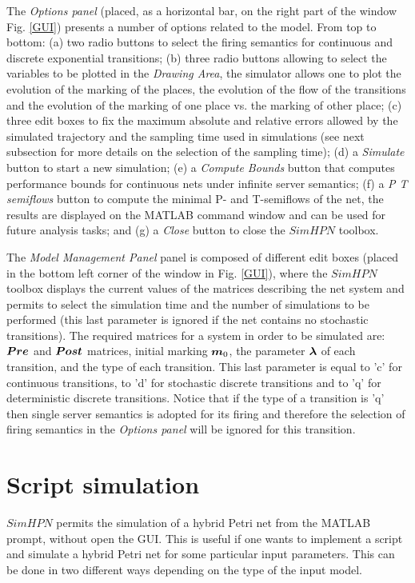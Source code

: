 The \emph{Options panel} (placed, as a horizontal bar, on the right part of the window Fig. \ref{GUI}) presents a number of options related to the model. From top to bottom: (a) two radio buttons to select the firing semantics for continuous and discrete exponential  transitions; (b) three radio buttons allowing to select the variables to be plotted in the \emph{Drawing Area}, the simulator allows one to plot the evolution of the marking
of the places, the evolution of the flow of the transitions and
the evolution of the marking of one place vs. the marking of other
place; (c) three edit boxes to fix the maximum absolute and relative errors allowed by the simulated trajectory and the sampling time used in simulations (see next subsection for more details on the selection of the sampling time); (d) a \emph{Simulate} button to start a new simulation; (e) a \emph{Compute Bounds} button that computes performance bounds for continuous nets under infinite server semantics; (f) a \emph{P T semiflows} button to compute the minimal P- and T-semiflows of the net, the results are displayed on the MATLAB command window and can be used for future analysis tasks; and (g) a \emph{Close} button to close the $SimHPN$ toolbox.

The \emph{Model Management Panel} panel is composed of different edit boxes (placed in the bottom left corner of the window in Fig. \ref{GUI}), where the $SimHPN$ toolbox displays the current values of the matrices describing the net system and permits to select the simulation time and the number of simulations to be performed (this last parameter is ignored if the net contains no stochastic transitions).  The required matrices for a system in order to be simulated are: $\b{Pre}$ and $\b{Post}$ matrices, initial marking $\mo$, the parameter $\b{\lambda}$ of each transition, and the type of each transition. This last parameter is equal to 'c' for continuous transitions, to 'd' for stochastic discrete transitions and to 'q' for deterministic discrete transitions. Notice that if the type of a transition is 'q' then single server semantics is adopted for its firing and therefore the selection of firing semantics in the \emph{Options panel} will be ignored for this transition.

\section{Script simulation}
$SimHPN$ permits the simulation of a hybrid Petri net from the MATLAB prompt, without open the GUI. This is useful if one wants to implement a script and simulate a hybrid Petri net for some particular input parameters. This can be done in two different ways depending on the type of the input model.

